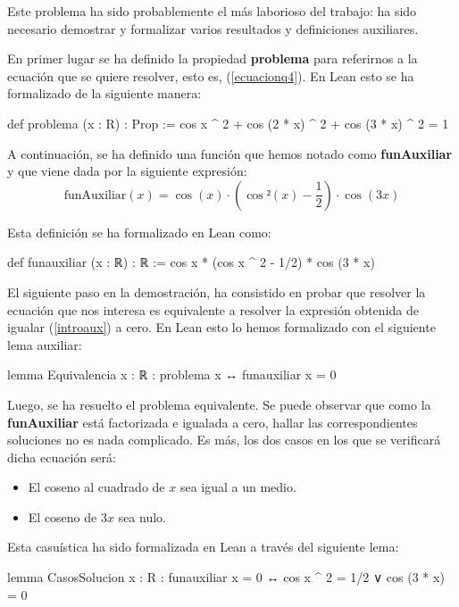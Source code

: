 Este problema ha sido probablemente el más laborioso del trabajo: ha
sido necesario demostrar y formalizar varios resultados y definiciones
auxiliares.

En primer lugar se ha definido la propiedad \textbf{problema} para
referirnos a la ecuación que se quiere resolver, esto es,
(\ref{ecuacionq4}). En Lean esto se ha formalizado de la siguiente
manera:
\begin{leancode}
def problema (x : R) : Prop :=
  cos x ^ 2 + cos (2 * x) ^ 2 + cos (3 * x) ^ 2 = 1
\end{leancode}

A continuación, se ha definido una función que hemos notado como
\textbf{funAuxiliar} y que viene dada por la siguiente expresión:
\begin{equation}\label{introaux}
  \text{funAuxiliar}(x)=\cos(x)·\left(\cos²(x)-\frac{1}{2}\right)·\cos(3x)
\end{equation}

Esta definición se ha formalizado en Lean como:
\begin{leancode}
def funauxiliar (x : ℝ) : ℝ :=
  cos x * (cos x ^ 2 - 1/2) * cos (3 * x)
\end{leancode}

El siguiente paso en la demostración, ha consistido en probar que
resolver la ecuación que nos interesa es equivalente a resolver la
expresión obtenida de igualar (\ref{introaux}) a cero. En Lean esto lo
hemos formalizado con el siguiente lema auxiliar:
\begin{leancode}
lemma Equivalencia
  {x : ℝ}
  : problema x ↔ funauxiliar x = 0
\end{leancode}

Luego, se ha resuelto el problema equivalente. Se puede observar que
como la \textbf{funAuxiliar} está factorizada e igualada a cero, hallar
las correspondientes soluciones no es nada complicado. Es más, los dos
casos en los que se verificará dicha ecuación será:
\begin{itemize}
\item El coseno al cuadrado de \(x\) sea igual a un medio.

\item El coseno de \(3x\) sea nulo.
\end{itemize}

Esta casuística ha sido formalizada en Lean a través del siguiente lema:
\begin{leancode}
lemma CasosSolucion
  {x : R}
  : funauxiliar x = 0 ↔ cos x ^ 2 = 1/2 ∨ cos (3 * x) = 0
\end{leancode}

